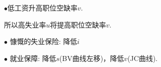\documentclass[UTF8, onecolumn, a4paper, 12pt]{article}
\begin{document}
$\bullet$低工资升高职位空缺率$v$. 

所以高失业率$u$将提高职位空缺率$v$.

$\bullet$ 慷慨的失业保险: 降低$i$

$\bullet$ 就业保障: 降低$s$(BV曲线左移)，降低$v$(JC曲线).
\begin{center}
	\begin{figure}[htb] %
		\centering %
		\begin{minipage}[b]{0.95\linewidth}
			\
			\hfill
		\end{minipage}
	\end{figure}
\end{center}
\end{document}
